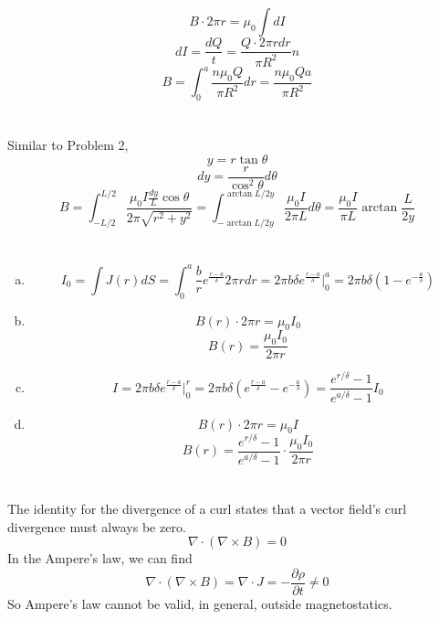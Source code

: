 \documentclass{article}
\begin{document}
\section{}
$$B\cdot2\pi r=\mu_0\int dI$$
$$dI=\frac{dQ}{t}=\frac{Q\cdot2\pi rdr}{\pi R^2}n$$
$$B=\int_0^a\frac{n\mu_0Q}{\pi R^2}dr=\frac{n\mu_0Qa}{\pi R^2}$$

\section{}
Similar to Problem 2,
$$y=r\tan\theta$$
$$dy=\frac{r}{\cos^2\theta}d\theta$$
$$B=\int_{-L/2}^{L/2}\frac{\mu_0I\frac{dy}{L}\cos\theta}{2\pi\sqrt{r^2+y^2}}
=\int_{-\arctan L/2y}^{\arctan L/2y}\frac{\mu_0I}{2\pi L}d\theta=\frac{\mu_0I}{\pi L}\arctan\frac{L}{2y}$$

\section{}
\begin{enumerate}[(a)]
\item
$$I_0=\int J(r)dS=\int_0^a\frac{b}{r}e^{\frac{r-a}{\delta}}2\pi rdr=2\pi b\delta e^{\frac{r-a}{\delta}}\bigg|_0^a=2\pi b\delta\left(1-e^{-\frac{a}{\delta}}\right)$$
\item
$$B(r)\cdot2\pi r=\mu_0I_0$$
$$B(r)=\frac{\mu_0I_0}{2\pi r}$$
\item
$$I=2\pi b\delta e^{\frac{r-a}{\delta}}\bigg|_0^r=2\pi b\delta\left(e^{\frac{r-a}{\delta}}-e^{-\frac{a}{\delta}}\right)=\frac{e^{r/\delta}-1}{e^{a/\delta}-1}I_0$$
\item
$$B(r)\cdot2\pi r=\mu_0I$$
$$B(r)=\frac{e^{r/\delta}-1}{e^{a/\delta}-1}\cdot\frac{\mu_0I_0}{2\pi r}$$
\end{enumerate}

\section{}
The identity for the divergence of a curl states that a vector field's curl divergence must always be zero.
$$\nabla\cdot(\nabla\times B)=0$$
In the Ampere's law, we can find
$$\nabla\cdot(\nabla\times B)=\nabla\cdot J=-\frac{\partial\rho}{\partial t}\neq0$$
So Ampere's law cannot be valid, in general, outside magnetostatics.
\end{document}
